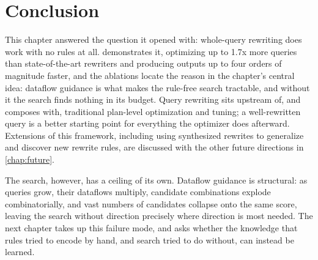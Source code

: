 \section{Conclusion}
\label{slab:sec:conc}

This chapter answered the question it opened with: whole-query
rewriting does work with no rules at all. \slabcity demonstrates it,
optimizing up to 1.7x more queries than state-of-the-art rewriters and
producing outputs up to four orders of magnitude faster, and the
ablations locate the reason in the chapter's central idea: dataflow
guidance is what makes the rule-free search tractable, and without it
the search finds nothing in its budget. Query rewriting sits upstream
of, and composes with, traditional plan-level optimization and tuning;
a well-rewritten query is a better starting point for everything the
optimizer does afterward. Extensions of this framework, including
using synthesized rewrites to generalize and discover new rewrite
rules, are discussed with the other future directions in
\cref{chap:future}.

The search, however, has a ceiling of its own. Dataflow guidance is
structural: as queries grow, their dataflows multiply, candidate
combinations explode combinatorially, and vast numbers of candidates
collapse onto the same score, leaving the search without direction
precisely where direction is most needed. The next chapter takes up
this failure mode, and asks whether the knowledge that rules tried to
encode by hand, and search tried to do without, can instead be
learned.
